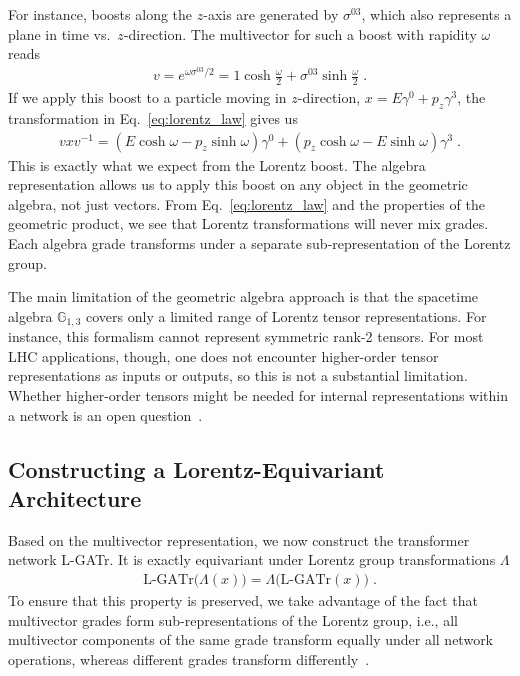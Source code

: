 \documentclass[submission, Phys]{SciPost}
\begin{document}
For instance, boosts along the $z$-axis are generated by $\sigma^{03}$, which also represents a plane in time vs.\ $z$-direction. The multivector for such a boost with rapidity $\omega$ reads
%
\begin{align}
    v = e^{\omega \sigma^{03}/2} = 1\cosh \frac{\omega}{2} + \sigma^{03}\sinh \frac{\omega}{2}  \; .
\end{align}
%
If we apply this boost to a particle moving in $z$-direction, $x=E\gamma^0+p_z\gamma^3$, the transformation in Eq.~\eqref{eq:lorentz_law} gives us 
%
\begin{align}
    vxv^{-1} = (E\cosh \omega - p_z\sinh \omega)\gamma^0 + (p_z\cosh \omega - E\sinh \omega)\gamma^3 \; .
\end{align}
%
This is exactly what we expect from the Lorentz boost. The algebra representation allows us to apply this boost on any object in the geometric algebra, not just vectors. From Eq.~\eqref{eq:lorentz_law} and the properties of the geometric product, we see that Lorentz transformations will never mix grades. Each algebra grade transforms under a separate sub-representation of the Lorentz group.

The main limitation of the geometric algebra approach is that the spacetime algebra $\mathbb{G}_{1,3}$ covers only a limited range of Lorentz tensor representations. For instance, this formalism cannot represent symmetric rank-2 tensors. For most LHC applications, though, one does not encounter higher-order tensor representations as inputs or outputs, so this is not a substantial limitation.  Whether higher-order tensors might be needed for internal representations within a network is an open question~\cite{DBLP:journals/corr/abs-2106-06610}.

\subsection{Constructing a Lorentz-Equivariant Architecture}

Based on the multivector representation, we now construct the transformer network L-GATr. It is exactly equivariant under Lorentz group transformations $\Lambda$
%
\begin{align}
    \text{L-GATr}\Big(\Lambda(x)\Big) = \Lambda \Big(\text{L-GATr}(x)\Big) \; .
\end{align}
%
To ensure that this property is preserved, we take advantage of the fact that multivector grades form sub-representations of the Lorentz group, i.e., all multivector components of the same grade transform equally under all network operations, whereas different grades transform differently~\cite{brehmer2023geometric,Spinner:2024hjm}.
\end{document}
